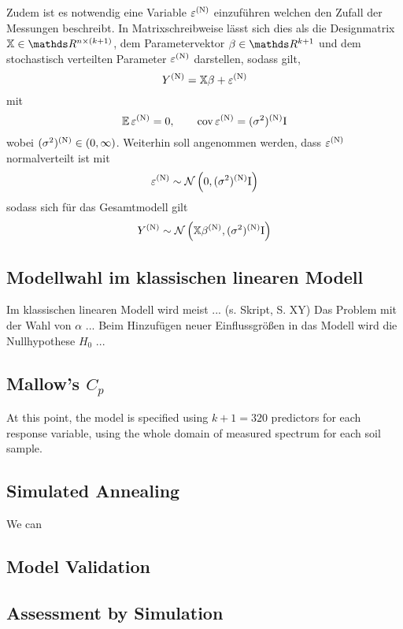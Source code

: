 		Zudem ist es notwendig eine Variable $\varepsilon^{\mathrm{(N)}}$ einzuführen welchen den Zufall der Messungen beschreibt.
	    In Matrixschreibweise lässt sich dies als die Designmatrix $\mathbb{X} \in \SR^{n \times (k+1)}$, dem Parametervektor $\beta \in \SR^{k+1}$ und dem stochastisch  verteilten Parameter $\varepsilon^{\mathrm{(N)}}$ darstellen, sodass gilt,
		\[
			Y^{\mathrm{(N)}} = \mathbb{X}\beta + \varepsilon^{\mathrm{(N)}}
		\]
		mit 
		\[
			\operatorname{\mathbb{E}} \varepsilon^{\mathrm{(N)}} = 0, \qquad \operatorname{cov} \varepsilon^{\mathrm{(N)}} = (\sigma^2)^{\mathrm{(N)}} \mathrm{I}
		\]
		wobei $(\sigma^2)^{\mathrm{(N)}} \in (0,\infty)$.
		Weiterhin soll angenommen werden, dass $\varepsilon^{\mathrm{(N)}}$ normalverteilt ist mit
	    \[
			\varepsilon^{\mathrm{(N)}} \sim \mathcal{N} \left( 0,(\sigma^2)^{\mathrm{(N)}}\mathrm{I} \right)
		\]
	    sodass sich für das Gesamtmodell gilt 
		\[
			Y^{\mathrm{(N)}} \sim \mathcal{N} \left( \mathbb{X}\beta^{\mathrm{(N)}},(\sigma^2)^{\mathrm{(N)}} \mathrm{I} \right)
		\]
	

	\subsection{Modellwahl im klassischen linearen Modell}
	\label{ssec:mlr}
	Im klassischen linearen Modell wird meist ... (s. Skript, S. XY)
	Das Problem mit der Wahl von $\alpha$ ...
	Beim Hinzufügen neuer Einflussgrößen in das Modell wird die Nullhypothese $H_0$ ...
	
		


	\subsection{Mallow's $C_{p}$}
	\label{ssec:mallows-C_p}
	
		At this point, the model is specified using $k+1 = 320$ predictors for each response variable, using the whole domain of measured spectrum for each soil sample.
		
		
	
	

	\subsection{Simulated Annealing}
	\label{ssec:model-selec}
	
		We can 

		
	\subsection{Model Validation}
	\label{ssec:model-validation}
	
	
	
	\subsection{Assessment by Simulation}
	\label{ssec:simulation}
	
		
		
